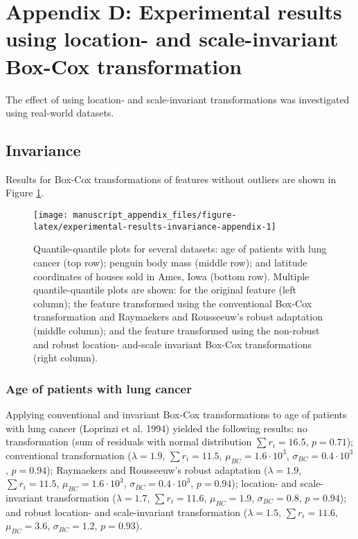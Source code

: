 \documentclass[
  a4paper,
]{article}
\begin{document}
\section{Appendix D: Experimental results using location- and
scale-invariant Box-Cox
transformation}\label{appendix-d-experimental-results-using-location--and-scale-invariant-box-cox-transformation}

The effect of using location- and scale-invariant transformations was
investigated using real-world datasets.

\subsection{Invariance}\label{invariance}

Results for Box-Cox transformations of features without outliers are
shown in Figure \ref{fig:experimental-results-invariance-appendix}.

\begin{figure}

{\centering \texttt{[image: manuscript\_appendix\_files/figure-latex/experimental-results-invariance-appendix-1]} 

}

\caption{Quantile-quantile plots for several datasets: age of patients with lung cancer (top row); penguin body mass (middle row); and latitude coordinates of houses sold in Ames, Iowa (bottom row). Multiple quantile-quantile plots are shown: for the original feature (left column); the feature transformed using the conventional Box-Cox transformation and Raymaekers and Rousseeuw's robust adaptation (middle column); and the feature transformed using the non-robust and robust location- and-scale invariant Box-Cox transformations (right column).}\label{fig:experimental-results-invariance-appendix}
\end{figure}

\subsubsection{Age of patients with lung
cancer}\label{age-of-patients-with-lung-cancer}

Applying conventional and invariant Box-Cox transformations to age of
patients with lung cancer (Loprinzi et al. 1994) yielded the following
results: no transformation (sum of residuals with normal distribution
\(\sum r_i = 16.5\), \(p = 0.71\)); conventional transformation
(\(\lambda = 1.9\), \(\sum r_i = 11.5\), \(\mu_{BC} = 1.6 \cdot 10^3\),
\(\sigma_{BC} = 0.4 \cdot 10^3\), \(p = 0.94\)); Raymaekers and
Rousseeuw's robust adaptation (\(\lambda = 1.9\), \(\sum r_i = 11.5\),
\(\mu_{BC} = 1.6 \cdot 10^3\), \(\sigma_{BC} = 0.4 \cdot 10^3\),
\(p = 0.94\)); location- and scale-invariant transformation
(\(\lambda = 1.7\), \(\sum r_i = 11.6\), \(\mu_{BC} = 1.9\),
\(\sigma_{BC} = 0.8\), \(p = 0.94\)); and robust location- and
scale-invariant transformation (\(\lambda = 1.5\), \(\sum r_i = 11.6\),
\(\mu_{BC} = 3.6\), \(\sigma_{BC} = 1.2\), \(p = 0.93\)).
\end{document}
